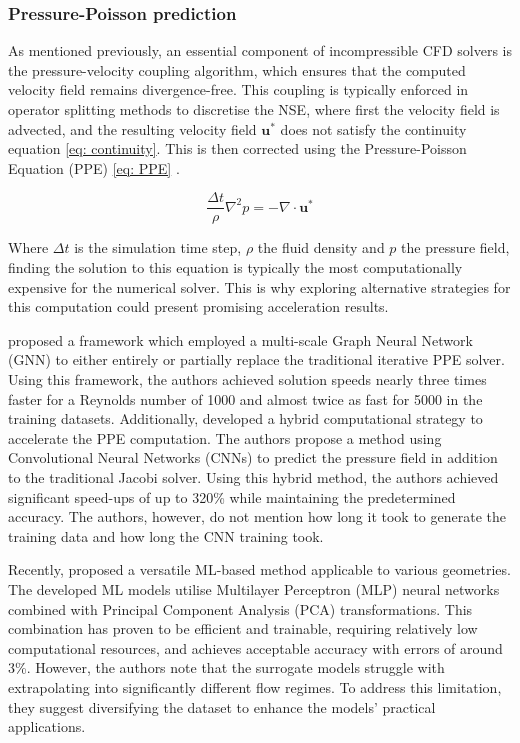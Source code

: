 \subsubsection{Pressure-Poisson prediction}
As mentioned previously, an essential component of incompressible CFD solvers is the pressure-velocity coupling algorithm, which ensures that the computed velocity field remains divergence-free. This coupling is typically enforced in operator splitting methods to discretise the NSE, where first the velocity field is advected, and the resulting velocity field $\mathbf{u^*}$ does not satisfy the continuity equation \ref{eq: continuity}. This is then corrected using the Pressure-Poisson Equation (PPE) \ref{eq: PPE} \cite{Vinuesa2022}. 

\begin{equation}\label{eq: PPE}
    \frac{\Delta t}{\rho} \nabla^2 p = -\nabla \cdot \mathbf{u}^*
\end{equation}

Where $\Delta t$ is the simulation time step, $\rho$ the fluid density and $p$ the pressure field, finding the solution to this equation is typically the most computationally expensive for the numerical solver. This is why exploring alternative strategies for this computation could present promising acceleration results. 

\textcite{Chen2022} proposed a framework which employed a multi-scale Graph Neural Network (GNN) to either entirely or partially replace the traditional iterative PPE solver. Using this framework, the authors achieved solution speeds nearly three times faster for a Reynolds number of 1000 and almost twice as fast for 5000 in the training datasets. Additionally, \textcite{Ajuria2020} developed a hybrid computational strategy to accelerate the PPE computation. The authors propose a method using Convolutional Neural Networks (CNNs) to predict the pressure field in addition to the traditional Jacobi solver. Using this hybrid method, the authors achieved significant speed-ups of up to 320\% while maintaining the predetermined accuracy. The authors, however, do not mention how long it took to generate the training data and how long the CNN training took. 

Recently, \textcite{Sousa2024} proposed a versatile ML-based method applicable to various geometries. The developed ML models utilise Multilayer Perceptron (MLP) neural networks combined with Principal Component Analysis (PCA) transformations. This combination has proven to be efficient and trainable, requiring relatively low computational resources, and achieves acceptable accuracy with errors of around 3\%. However, the authors note that the surrogate models struggle with extrapolating into significantly different flow regimes. To address this limitation, they suggest diversifying the dataset to enhance the models' practical applications.

